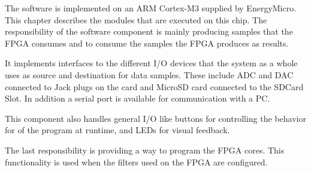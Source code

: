 
The software is implemented on an ARM Cortex-M3 supplied by
EnergyMicro. This chapter describes the modules that are
executed on this chip. The responsibility of the software
component is mainly producing samples that the FPGA consumes and
to consume the samples the FPGA produces as results.

It implements interfaces to the different I/O devices that the
system as a whole uses as source and destination for data
samples. These include ADC and DAC connected to Jack plugs on
the card and MicroSD card connected to the SDCard Slot. In
addition a serial port is available for communication with a PC.

This component also handles general I/O like buttons for
controlling the behavior for of the program at runtime, and LEDs
for visual feedback.

The last responsibility is providing a way to program the FPGA
cores. This functionality is used when the filters used on the
FPGA are configured. 
